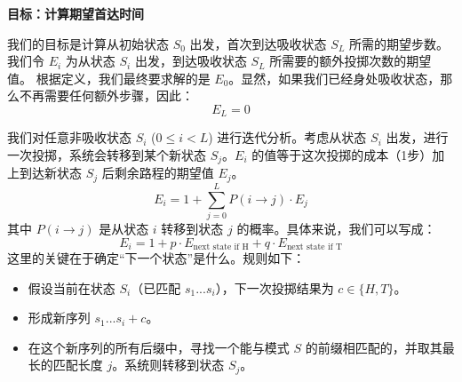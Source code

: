\documentclass[UTF8]{ctexart}
\begin{document}
\textbf{目标：计算期望首达时间}

我们的目标是计算从初始状态 $S_0$ 出发，首次到达吸收状态 $S_L$ 所需的期望步数。我们令 $E_i$ 为从状态 $S_i$ 出发，到达吸收状态 $S_L$ 所需要的额外投掷次数的期望值。
根据定义，我们最终要求解的是 $E_0$。显然，如果我们已经身处吸收状态，那么不再需要任何额外步骤，因此：
$$ E_L = 0 $$

我们对任意非吸收状态 $S_i$ ($0 \le i < L$) 进行迭代分析。考虑从状态 $S_i$ 出发，进行一次投掷，系统会转移到某个新状态 $S_j$。$E_i$ 的值等于这次投掷的成本（1步）加上到达新状态 $S_j$ 后剩余路程的期望值 $E_j$。
$$ E_i = 1 + \sum_{j=0}^{L} P(i \to j) \cdot E_j $$
其中 $P(i \to j)$ 是从状态 $i$ 转移到状态 $j$ 的概率。具体来说，我们可以写成：
$$ E_i = 1 + p \cdot E_{\text{next state if H}} + q \cdot E_{\text{next state if T}} $$
这里的关键在于确定“下一个状态”是什么。规则如下：
\begin{itemize}
    \item 假设当前在状态 $S_i$（已匹配 $s_1...s_i$），下一次投掷结果为 $c \in \{H, T\}$。
    \item 形成新序列 $s_1...s_i + c$。
    \item 在这个新序列的所有后缀中，寻找一个能与模式 $S$ 的前缀相匹配的，并取其最长的匹配长度 $j$。系统则转移到状态 $S_j$。
\end{itemize}

\iffalse
\end{document}
